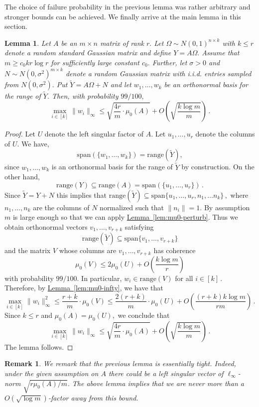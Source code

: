 \documentclass[letterpaper,11pt]{article}
\newtheorem{remark}[theorem]{Remark}
\newtheorem{lemma}[theorem]{Lemma}
\theoremstyle{definition}
\newcommand{\lemmalabel}[1]{\label{lem:#1}}
\newcommand{\lemmaref}[1]{\hyperref[lem:#1]{Lemma~\ref{lem:#1}}}
\newcommand{\mper}{\,.}
\newcommand{\mcom}{\,,}
\renewcommand{\le}{\leqslant}
\renewcommand{\ge}{\geqslant}
\newcommand{\range}{\mathrm{range}}
\begin{document}
The choice of failure probability in the previous lemma was rather arbitrary
and stronger bounds can be achieved.
We finally arrive at the main lemma in this section.

\begin{lemma}\lemmalabel{mu0-projection}
Let $A$ be an $m\times n$ matrix of rank $r.$
Let $\Omega\sim N(0,1)^{n\times k}$ with $k\le r$
denote a random standard Gaussian matrix and define $Y=A\Omega.$
Assume that $m\ge c_0kr\log r$ for sufficiently large constant $c_0.$
Further, let $\sigma>0$ and
$N\sim N(0,\sigma^2)^{m\times k}$ denote a random Gaussian matrix with i.i.d.
entries sampled from $N(0,\sigma^2).$ Put $\tilde Y = A\Omega + N$
and let
$w_1,\dots,w_k$ be an orthonormal basis for the range of $\tilde Y.$
Then, with probability $99/100,$
\[
\max_{i\in[k]}\|w_i\|_\infty
\le
\sqrt{\frac {4r}m\cdot\mu_0(A)}
+ O\left(\sqrt{\frac{k\log m}m}\right)\mper
\]
\end{lemma}

\begin{proof}
Let $U$ denote the left singular factor of $A.$ Let $u_1,\dots,u_r$ denote the
columns of $U.$ We have,
\[
\mathrm{span}(\{w_1,\dots,w_k\})=\range(\tilde Y),
\]
since $w_1,\dots,w_k$ is an orthonormal basis for the range of $\tilde Y$ by
construction. On the other hand,
\[
\mathrm{range}(Y)\subseteq\range(A)=\mathrm{span}(\{u_1,\dots,u_r\})\mper
\]
Since $\tilde Y = Y + N$ this implies that
$\mathrm{range}(\tilde Y) \subseteq\mathrm{span}\{u_1,\dots,u_r,n_1,\dots
n_k\}\mcom$
where $n_1,\dots,n_k$ are the columns of $N$ normalized such that $\|n_i\|=1.$
By assumption $m$ is large enough so that we can apply \lemmaref{mu0-perturb}.
Thus we obtain orthonormal vectors $v_1,\dots,v_{r+k}$ satisfying
\[
\mathrm{range}(\tilde Y) \subseteq\mathrm{span}\{v_1,\dots,v_{r+k}\}
\]
and the matrix $V$ whose columns are $v_1,\dots,v_{r+k}$ has coherence
\[
\mu_0(V)\le 2\mu_0(U)
+ O\left(\frac{k\log m}{r}\right)
\]
with probability $99/100.$ In particular,
$w_i \in \range(V)$ for all $i\in[k]\mper$ Therefore,
by \lemmaref{mu0-infty}, we have that
\[
\max_{i\in[k]} \|w_i\|_\infty^2
\le \frac{r+k}{m}\cdot\mu_0(V)
\le
\frac{2(r+k)}{m}\cdot\mu_0(U)
+ O\left( \frac{(r+k)k\log m}{rm}\right)\mper
\]
Since $k\le r$ and $\mu_0(A)=\mu_0(U),$ we conclude that
\[
\max_{i\in[k]} \|w_i\|_\infty
\le
\sqrt{\frac{4r}{m}\cdot\mu_0(A)}
+ O\left(\sqrt{\frac{k\log m}m}\right)\mper
\]
The lemma follows.
\end{proof}

\begin{remark}
We remark that the previous lemma is essentially tight. Indeed, under the
given assumption on $A$ there could be a left singular vector of
$\ell_\infty$-norm $\sqrt{r\mu_0(A)/m}.$ The above lemma implies that
we are never more than a $O(\sqrt{\log m})$-factor away from this bound.
\end{remark}
\end{document}
